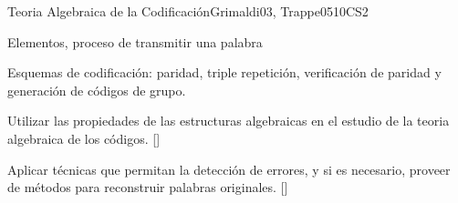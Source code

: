 \begin{syllabus}
\begin{unit}{}{Teoria Algebraica de la Codificación}{Grimaldi03, Trappe05}{10}{CS2}
   \begin{topics}
    	\item  Elementos, proceso de transmitir una palabra
    	\item Esquemas de codificación: paridad, triple repetición, verificación de paridad y generación de códigos de grupo.
	 \end{topics}
   \begin{learningoutcomes}
      	\item  Utilizar las propiedades de las estructuras algebraicas en el estudio  de la teoria algebraica de los códigos. [\Familiarity]
	 \item Aplicar técnicas que permitan la detección de errores, y si es necesario, proveer de métodos para reconstruir palabras originales. [\Usage]
   \end{learningoutcomes}
\end{unit}




\begin{coursebibliography}
\end{coursebibliography}

\end{syllabus}



